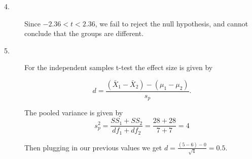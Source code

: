\documentclass{tufte-handout}
\begin{document}
\begin{fullwidth}
\begin{description}
\item[4.] Since $-2.36<t<2.36$, we fail to reject the null hypothesis, and cannot conclude that the groups are different.

\item[5.]For the independent samples t-test the effect size is given by

\begin{equation*}
d=\frac{(\bar{X}_1-\bar{X}_2)-(\mu_1-\mu_2)}{s_p}.
\end{equation*}

The pooled variance is given by
\begin{equation*}
s_p^2=\frac{SS_1+SS_2}{df_1+df_2}=\frac{28+28}{7+7}=4
\end{equation*}

Then plugging in our previous values we get $d=\frac{(5-6)-0}{\sqrt{4}}=0.5$.
\end{description}
\end{fullwidth}
\end{document}
